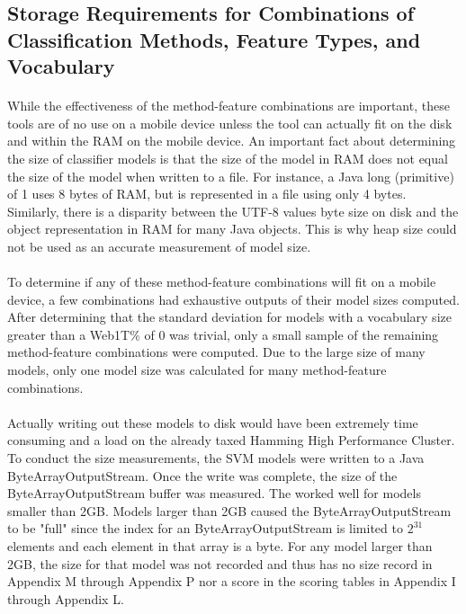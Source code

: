 \begin{singlespace}
\section{Storage Requirements for Combinations of Classification Methods, Feature Types, and Vocabulary}
\end{singlespace}
	\paragraph*{} While the effectiveness of the method-feature combinations are important, these tools are of no use on a mobile device unless the tool can actually fit on the disk and within the RAM on the mobile device.  An important fact about determining the size of classifier models is that the size of the model in RAM does not equal the size of the model when written to a file.  For instance, a Java long (primitive) of 1 uses 8 bytes of RAM, but is represented in a file using only 4 bytes.  Similarly, there is a disparity between the UTF-8 values byte size on disk and the object representation in RAM for many Java objects.  This is why heap size could not be used as an accurate measurement of model size.
	\paragraph*{}To determine if any of these method-feature combinations will fit on a mobile device, a few combinations had exhaustive outputs of their model sizes computed.  After determining that the standard deviation for models with a vocabulary size greater than a Web1T\% of 0 was trivial, only a small sample of the remaining method-feature combinations were computed.  Due to the large size of many models, only one model size was calculated for many method-feature combinations.  
	\paragraph*{} Actually writing out these models to disk would have been extremely time consuming and a load on the already taxed Hamming High Performance Cluster.  To conduct the size measurements, the SVM models were written to a Java ByteArrayOutputStream.  Once the write was complete, the size of the ByteArrayOutputStream buffer was measured.  The worked well for models smaller than 2GB.  Models larger than 2GB caused the ByteArrayOutputStream to be "full" since the index for an ByteArrayOutputStream is limited to $2^{31}$ elements and each element in that array is a byte.  For any model larger than 2GB, the size for that model was not recorded and thus has no size record in Appendix M through Appendix P nor a score in the scoring tables in Appendix I through Appendix L.
